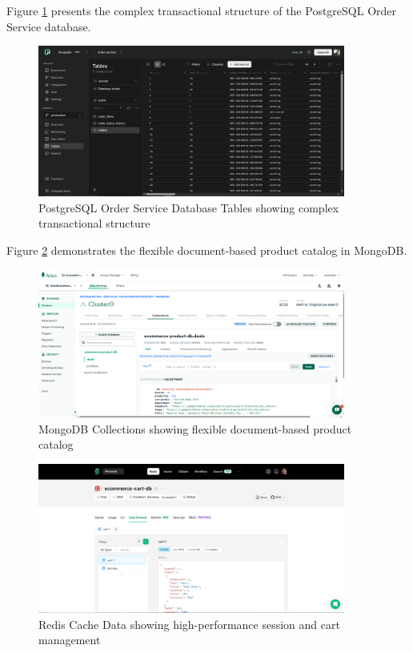 Figure \ref{fig:postgresql-order-tables} presents the complex transactional structure of the PostgreSQL Order Service database.

\begin{figure}[H]
\centering
\includegraphics[width=0.9\textwidth]{figures/chapter5/postgresql-database-order-tables.png}
\caption{PostgreSQL Order Service Database Tables showing complex transactional structure}
\label{fig:postgresql-order-tables}
\end{figure}

Figure \ref{fig:mongodb-collections} demonstrates the flexible document-based product catalog in MongoDB.

\begin{figure}[H]
\centering
\includegraphics[width=0.9\textwidth]{figures/chapter5/mongodb-collections.png}
\caption{MongoDB Collections showing flexible document-based product catalog}
\label{fig:mongodb-collections}
\end{figure}


\begin{figure}[H]
\centering
\includegraphics[width=0.9\textwidth]{figures/chapter5/redis-cache-data.png}
\caption{Redis Cache Data showing high-performance session and cart management}
\label{fig:redis-cache-data}
\end{figure}


